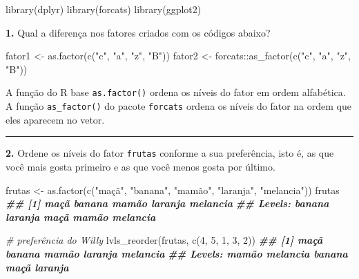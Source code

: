 \documentclass[
]{book}
\newenvironment{Shaded}{\begin{snugshade}}{\end{snugshade}}
\newcommand{\CommentTok}[1]{\textcolor[rgb]{0.56,0.35,0.01}{\textit{#1}}}
\newcommand{\DecValTok}[1]{\textcolor[rgb]{0.00,0.00,0.81}{#1}}
\newcommand{\DocumentationTok}[1]{\textcolor[rgb]{0.56,0.35,0.01}{\textbf{\textit{#1}}}}
\newcommand{\FunctionTok}[1]{\textcolor[rgb]{0.00,0.00,0.00}{#1}}
\newcommand{\NormalTok}[1]{#1}
\newcommand{\OtherTok}[1]{\textcolor[rgb]{0.56,0.35,0.01}{#1}}
\newcommand{\SpecialCharTok}[1]{\textcolor[rgb]{0.00,0.00,0.00}{#1}}
\newcommand{\StringTok}[1]{\textcolor[rgb]{0.31,0.60,0.02}{#1}}
\begin{document}
\begin{Shaded}
\begin{Highlighting}[]
\FunctionTok{library}\NormalTok{(dplyr)}
\FunctionTok{library}\NormalTok{(forcats)}
\FunctionTok{library}\NormalTok{(ggplot2)}
\end{Highlighting}
\end{Shaded}

\textbf{1.} Qual a diferença nos fatores criados com os códigos abaixo?

\begin{Shaded}
\begin{Highlighting}[]
\NormalTok{fator1 }\OtherTok{\textless{}{-}} \FunctionTok{as.factor}\NormalTok{(}\FunctionTok{c}\NormalTok{(}\StringTok{"c"}\NormalTok{, }\StringTok{"a"}\NormalTok{, }\StringTok{"z"}\NormalTok{, }\StringTok{"B"}\NormalTok{))}
\NormalTok{fator2 }\OtherTok{\textless{}{-}}\NormalTok{ forcats}\SpecialCharTok{::}\FunctionTok{as\_factor}\NormalTok{(}\FunctionTok{c}\NormalTok{(}\StringTok{"c"}\NormalTok{, }\StringTok{"a"}\NormalTok{, }\StringTok{"z"}\NormalTok{, }\StringTok{"B"}\NormalTok{))}
\end{Highlighting}
\end{Shaded}

A função do R base \texttt{as.factor()} ordena os níveis do fator em ordem alfabética. A função \texttt{as\_factor()} do pacote \texttt{forcats} ordena os níveis do fator na ordem que eles aparecem no vetor.

\begin{center}\rule{0.5\linewidth}{0.5pt}\end{center}

\textbf{2.} Ordene os níveis do fator \texttt{frutas} conforme a sua preferência, isto é, as que você mais gosta primeiro e as que você menos gosta por último.

\begin{Shaded}
\begin{Highlighting}[]
\NormalTok{frutas }\OtherTok{\textless{}{-}} \FunctionTok{as.factor}\NormalTok{(}\FunctionTok{c}\NormalTok{(}\StringTok{"maçã"}\NormalTok{, }\StringTok{"banana"}\NormalTok{, }\StringTok{"mamão"}\NormalTok{, }\StringTok{"laranja"}\NormalTok{, }\StringTok{"melancia"}\NormalTok{))}
\NormalTok{frutas}
\DocumentationTok{\#\# [1] maçã     banana   mamão    laranja  melancia}
\DocumentationTok{\#\# Levels: banana laranja maçã mamão melancia}

\CommentTok{\# preferência do Willy}
\FunctionTok{lvls\_reorder}\NormalTok{(frutas, }\FunctionTok{c}\NormalTok{(}\DecValTok{4}\NormalTok{, }\DecValTok{5}\NormalTok{, }\DecValTok{1}\NormalTok{, }\DecValTok{3}\NormalTok{, }\DecValTok{2}\NormalTok{))}
\DocumentationTok{\#\# [1] maçã     banana   mamão    laranja  melancia}
\DocumentationTok{\#\# Levels: mamão melancia banana maçã laranja}
\end{Highlighting}
\end{Shaded}
\end{document}
